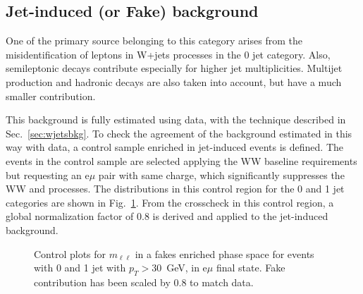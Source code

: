 \subsection{Jet-induced (or Fake) background}

One of the primary source belonging to this category arises from the misidentification of leptons in W+jets processes in the 0 jet category. Also, semileptonic \ttbar decays contribute especially for higher jet multiplicities. Multijet production and hadronic \ttbar decays are also taken into account, but have a much smaller contribution.

This background is fully estimated using data, with the technique described in Sec.~\ref{sec:wjetsbkg}. To check the agreement of the background estimated in this way with data, a control sample enriched in jet-induced events is defined. The events in the control sample are selected applying the WW baseline requirements but requesting an e$\mu$ pair with same charge, which significantly suppresses the WW and \ttbar processes. The \mll distributions in this control region for the 0 and 1 jet categories are shown in Fig.~\ref{fig:13TeVsamesign}. From the crosscheck in this control region, a global normalization factor of 0.8 is derived and applied to the jet-induced background.

\begin{figure}[!h]
\centering
    \caption{
         Control plots for $m_{\ell\ell}$ in a fakes enriched phase space for events with 0 and 1 jet with $p_{T} > 30$~GeV,
         in e$\mu$ final state.
         Fake contribution has been scaled by 0.8 to match data.
         }\label{fig:13TeVsamesign}
\end{figure}




